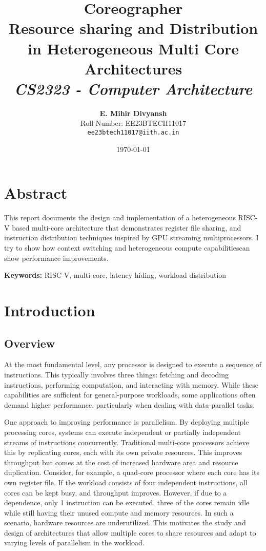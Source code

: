 \documentclass[12pt,letterpaper]{report}
\title{
    \vspace{2in}
    \textmd{\textbf{Coreographer}}\\
    \normalsize\vspace{0.1in}\small{Resource sharing and Distribution in Heterogeneous Multi Core Architectures}\\
    \vspace{0.1in}\large{\textit{CS2323 - Computer Architecture}}
    \vspace{3in}
}
\author{
    \textbf{E. Mihir Divyansh}\\
    Roll Number: EE23BTECH11017\\
    \texttt{ee23btech11017@iith.ac.in}
}
\date{\today}
\theoremstyle{definition}
\theoremstyle{plain}
\begin{document}
\maketitle
\thispagestyle{empty}

\tableofcontents
\listoffigures
\listoftables
\lstlistoflistings

\chapter*{Abstract}

This report documents the design and implementation of a heterogeneous RISC-V based 
multi-core architecture that demonstrates register file
sharing, and instruction distribution techniques
inspired by GPU streaming multiprocessors. I try to show how context switching and 
heterogeneous compute capabilitiescan show performance improvements.

\textbf{Keywords:} RISC-V, multi-core, latency hiding, workload distribution

\chapter{Introduction}


\section{Overview}
At the most fundamental level, any processor is designed to execute a sequence of instructions. 
This typically involves three things: fetching and decoding instructions, 
performing computation, and interacting with memory. 
While these capabilities are sufficient for general-purpose workloads, some applications 
often demand higher performance, particularly when dealing with data-parallel tasks.

One approach to improving performance is parallelism. By deploying multiple 
processing cores, systems can execute independent or partially independent streams of 
instructions concurrently. Traditional multi-core processors achieve this by replicating 
cores, each with its own private resources. This improves throughput but comes at the cost 
of increased hardware area and resource duplication. 
Consider, for example, a quad-core processor where each core has its own 
register file. If the workload consists of 
four independent instructions, all cores can be kept busy, and throughput improves. However, 
if due to a dependence, only 1 instruction can be executed, three of the cores remain idle while still 
having their unused compute and memory resources. In such a scenario, hardware resources are 
underutilized. This motivates the study and design of architectures 
that allow multiple cores to share resources and adapt to varying levels of 
parallelism in the workload.
\end{document}
